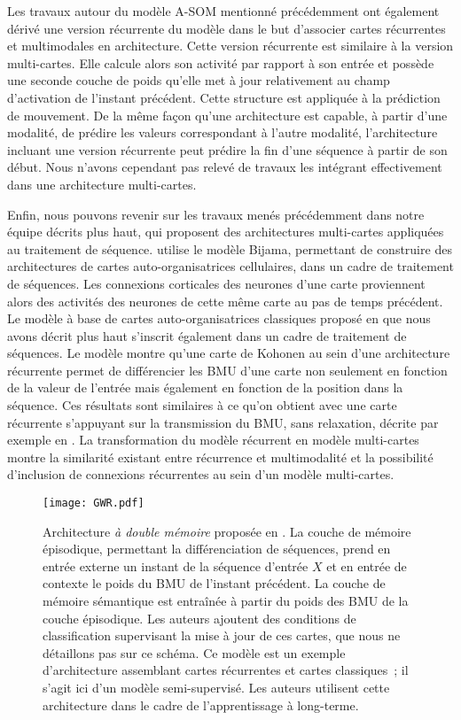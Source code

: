 \documentclass[../main]{subfiles}
\begin{document}
Les travaux autour du modèle A-SOM mentionné précédemment ont également dérivé une version récurrente du modèle \parencite{Buonamente2015DiscriminatingAS} dans le but d'associer cartes récurrentes et multimodales en architecture.
Cette version récurrente est similaire à la version multi-cartes. Elle calcule alors son activité par rapport à son entrée et possède une seconde couche de poids qu'elle met à jour relativement au champ d'activation de l'instant précédent.
Cette structure est appliquée à la prédiction de mouvement. De la même façon qu'une architecture est capable, à partir d'une modalité, de prédire les valeurs correspondant à l'autre modalité, l'architecture incluant une version récurrente peut prédire la fin d'une séquence à partir de son début.
Nous n'avons cependant pas relevé de travaux les intégrant effectivement dans une architecture multi-cartes.

Enfin, nous pouvons revenir sur les travaux menés précédemment dans notre équipe décrits plus haut, qui proposent des architectures multi-cartes appliquées au traitement de séquence.
\cite{khouzam_neural_2014} utilise le modèle Bijama, permettant de construire des architectures de cartes auto-organisatrices cellulaires, dans un cadre de traitement de séquences.
Les connexions corticales des neurones d'une carte proviennent alors des activités des neurones de cette même carte au pas de temps précédent.
Le modèle à base de cartes auto-organisatrices classiques proposé en \cite{baheux_towards_2014} que nous avons décrit plus haut s'inscrit également dans un cadre de traitement de séquences. Le modèle montre qu'une carte de Kohonen au sein d'une architecture récurrente permet de différencier les BMU d'une carte non seulement en fonction de la valeur de l'entrée mais également en fonction de la position dans la séquence. Ces résultats sont similaires à ce qu'on obtient avec une carte récurrente s'appuyant sur la transmission du BMU, sans relaxation, décrite par exemple en \cite{fix20}. La transformation du modèle récurrent en modèle multi-cartes montre la similarité existant entre récurrence et multimodalité et la possibilité d'inclusion de connexions récurrentes au sein d'un modèle multi-cartes.


\begin{figure}
    \centering
    \texttt{[image: GWR.pdf]}
    \caption{Architecture \emph{à double mémoire} proposée en \cite{parisiLL}. 
    La couche de mémoire épisodique, permettant la différenciation de séquences, prend en entrée externe un instant de la séquence d'entrée $X$ et en entrée de contexte le poids du BMU de l'instant précédent.
    La couche de mémoire sémantique est entraînée à partir du poids des BMU de la couche épisodique. Les auteurs ajoutent des conditions de classification supervisant la mise à jour de ces cartes, que nous ne détaillons pas sur ce schéma. Ce modèle est un exemple d'architecture assemblant cartes récurrentes et cartes classiques~; il s'agit ici d'un modèle semi-supervisé. Les auteurs utilisent cette architecture dans le cadre de l'apprentissage à long-terme.\label{fig:parisi}}
\end{figure}
\end{document}

